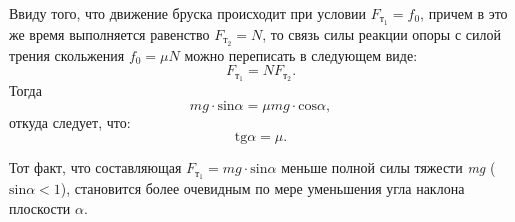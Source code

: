 \documentclass[14pt,a4paper,oneside]{extarticle}	%
\begin{document}
Ввиду того, что движение бруска происходит при условии $  F_{\text{т}_1}=f_0 $, причем в это же время выполняется равенство $ F_{\text{т}_2}=N $, то связь силы реакции опоры с силой трения скольжения $ f_0 = \mu N $ можно переписать в следующем виде:
	\begin{equation}\label{friction-4eq4}
F_{\text{т}_1} = NF_{\text{т}_2}.
\end{equation}
Тогда
 	\begin{equation}\label{friction-4eq5}
  mg \cdot \text{sin}\alpha = \mu mg \cdot \text{cos}\alpha,
 \end{equation}
откуда следует, что:
 	\begin{equation}\label{friction-4eq6}
\text{tg}\alpha = \mu.
\end{equation}

Тот факт, что составляющая $ F_{\text{т}_1} = mg \cdot\text{sin}\alpha $ меньше полной силы тяжести \textit{mg} ($\text{sin}\alpha < 1$), становится более очевидным по мере уменьшения угла наклона плоскости $ \alpha $.
\end{document}
